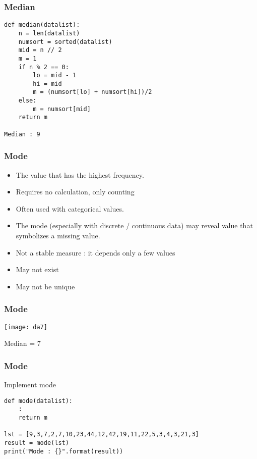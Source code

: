\begin{frame}[fragile]\frametitle{Median}
\begin{lstlisting}
def median(datalist):
    n = len(datalist)
    numsort = sorted(datalist)
    mid = n // 2
    m = 1
    if n % 2 == 0:
        lo = mid - 1
        hi = mid
        m = (numsort[lo] + numsort[hi])/2
    else:
        m = numsort[mid]
    return m

Median : 9
\end{lstlisting}
\end{frame}



\begin{frame}[fragile]\frametitle{Mode}	

\begin{itemize}
\item The value that has the highest frequency.
\item Requires no calculation, only counting
\item Often used with categorical values.
\item The mode (especially with discrete / continuous data) may reveal value that symbolizes a missing value.
\item Not a stable measure : it depends only a few values
\item May not exist
\item May not be unique
\end{itemize}

\end{frame}

\begin{frame}[fragile]\frametitle{Mode}	
\begin{center}
\texttt{[image: da7]}
\end{center}
Median = 7
\end{frame}


\begin{frame}[fragile]\frametitle{Mode}
Implement mode
\begin{lstlisting}
def mode(datalist):
	:
	return m

lst = [9,3,7,2,7,10,23,44,12,42,19,11,22,5,3,4,3,21,3]
result = mode(lst)
print("Mode : {}".format(result))
\end{lstlisting}
\end{frame}


